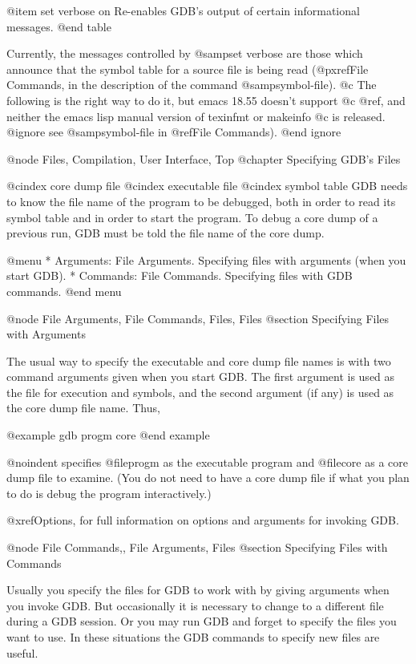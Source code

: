 @item set verbose on
Re-enables GDB's output of certain informational messages.
@end table

Currently, the messages controlled by @samp{set verbose} are those which
announce that the symbol table for a source file is being read
(@pxref{File Commands}, in the description of the command
@samp{symbol-file}).
@c The following is the right way to do it, but emacs 18.55 doesn't support
@c @ref, and neither the emacs lisp manual version of texinfmt or makeinfo
@c is released.  
@ignore
see @samp{symbol-file} in @ref{File Commands}).
@end ignore

@node Files, Compilation, User Interface, Top
@chapter Specifying GDB's Files

@cindex core dump file
@cindex executable file
@cindex symbol table
GDB needs to know the file name of the program to be debugged, both in
order to read its symbol table and in order to start the program.  To
debug a core dump of a previous run, GDB must be told the file name of
the core dump.

@menu
* Arguments: File Arguments.   Specifying files with arguments
                                (when you start GDB).
* Commands: File Commands.     Specifying files with GDB commands.
@end menu

@node File Arguments, File Commands, Files, Files
@section Specifying Files with Arguments

The usual way to specify the executable and core dump file names is with
two command arguments given when you start GDB.  The first argument is used
as the file for execution and symbols, and the second argument (if any) is
used as the core dump file name.  Thus,

@example
gdb progm core
@end example

@noindent
specifies @file{progm} as the executable program and @file{core} as a core
dump file to examine.  (You do not need to have a core dump file if what
you plan to do is debug the program interactively.)

@xref{Options}, for full information on options and arguments for
invoking GDB.

@node File Commands,, File Arguments, Files
@section Specifying Files with Commands

Usually you specify the files for GDB to work with by giving arguments when
you invoke GDB.  But occasionally it is necessary to change to a different
file during a GDB session.  Or you may run GDB and forget to specify the
files you want to use.  In these situations the GDB commands to specify new
files are useful.


